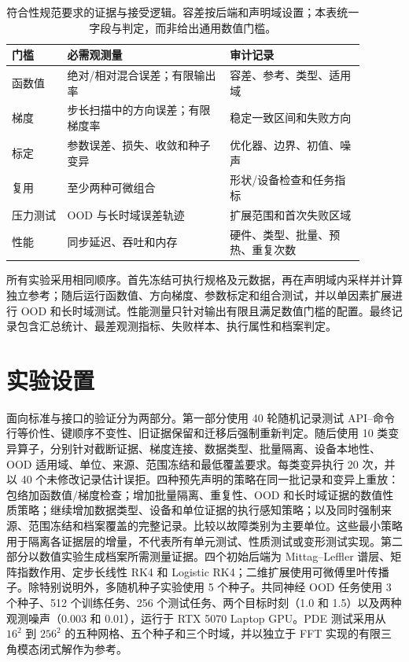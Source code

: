 \documentclass[preprint,12pt,authoryear]{elsarticle}
\begin{document}
\begin{table}[t]
\centering
\setlength{\tabcolsep}{4pt}
\caption{符合性规范要求的证据与接受逻辑。容差按后端和声明域设置；本表统一字段与判定，而非给出通用数值门槛。}
\label{tab:contract-gates-zh}
\begin{tabular}{>{\raggedright\arraybackslash}p{0.14\linewidth}>{\raggedright\arraybackslash}p{0.41\linewidth}>{\raggedright\arraybackslash}p{0.34\linewidth}}
\toprule
门槛 & 必需观测量 & 审计记录\\
\midrule
函数值 & 绝对/相对混合误差；有限输出率 & 容差、参考、类型、适用域\\
梯度 & 步长扫描中的方向误差；有限梯度率 & 稳定一致区间和失败方向\\
标定 & 参数误差、损失、收敛和种子变异 & 优化器、边界、初值、噪声\\
复用 & 至少两种可微组合 & 形状/设备检查和任务指标\\
压力测试 & OOD 与长时域误差轨迹 & 扩展范围和首次失败区域\\
性能 & 同步延迟、吞吐和内存 & 硬件、类型、批量、预热、重复次数\\
\bottomrule
\end{tabular}
\end{table}

所有实验采用相同顺序。首先冻结可执行规格及元数据，再在声明域内采样并计算独立参考；随后运行函数值、方向梯度、参数标定和组合测试，并以单因素扩展进行 OOD 和长时域测试。性能测量只针对输出有限且满足数值门槛的配置。最终记录包含汇总统计、最差观测指标、失败样本、执行属性和档案判定。

\section{实验设置}
面向标准与接口的验证分为两部分。第一部分使用 40 轮随机记录测试 API--命令行等价性、键顺序不变性、旧证据保留和迁移后强制重新判定。随后使用 10 类变异算子，分别针对截断证据、梯度连接、数据类型、批量隔离、设备本地性、OOD 适用域、单位、来源、范围冻结和最低覆盖要求。每类变异执行 20 次，并以 40 个未修改记录估计误拒。四种预先声明的策略在同一批记录和变异上重放：包络加函数值/梯度检查；增加批量隔离、重复性、OOD 和长时域证据的数值性质策略；继续增加数据类型、设备和单位证据的执行感知策略；以及同时强制来源、范围冻结和档案覆盖的完整记录。比较以故障类别为主要单位。这些最小策略用于隔离各证据层的增量，不代表所有单元测试、性质测试或变形测试实现。第二部分以数值实验生成档案所需测量证据。四个初始后端为 Mittag--Leffler 谱层、矩阵指数作用、定步长线性 RK4 和 Logistic RK4；二维扩展使用可微傅里叶传播子。除特别说明外，多随机种子实验使用 5 个种子。共同神经 OOD 任务使用 3 个种子、512 个训练任务、256 个测试任务、两个目标时刻（1.0 和 1.5）以及两种观测噪声（0.003 和 0.01），运行于 RTX 5070 Laptop GPU。PDE 测试采用从 $16^2$ 到 $256^2$ 的五种网格、五个种子和三个时域，并以独立于 FFT 实现的有限三角模态闭式解作为参考。
\end{document}
